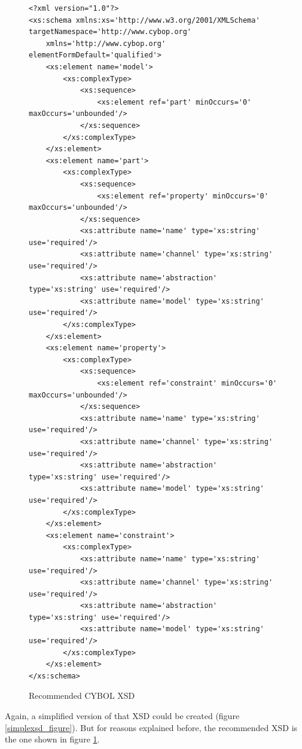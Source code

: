 \begin{figure}[ht]
    \bigskip
    \bigskip
    \begin{scriptsize}
        \begin{verbatim}
<?xml version="1.0"?>
<xs:schema xmlns:xs='http://www.w3.org/2001/XMLSchema' targetNamespace='http://www.cybop.org'
    xmlns='http://www.cybop.org' elementFormDefault='qualified'>
    <xs:element name='model'>
        <xs:complexType>
            <xs:sequence>
                <xs:element ref='part' minOccurs='0' maxOccurs='unbounded'/>
            </xs:sequence>
        </xs:complexType>
    </xs:element>
    <xs:element name='part'>
        <xs:complexType>
            <xs:sequence>
                <xs:element ref='property' minOccurs='0' maxOccurs='unbounded'/>
            </xs:sequence>
            <xs:attribute name='name' type='xs:string' use='required'/>
            <xs:attribute name='channel' type='xs:string' use='required'/>
            <xs:attribute name='abstraction' type='xs:string' use='required'/>
            <xs:attribute name='model' type='xs:string' use='required'/>
        </xs:complexType>
    </xs:element>
    <xs:element name='property'>
        <xs:complexType>
            <xs:sequence>
                <xs:element ref='constraint' minOccurs='0' maxOccurs='unbounded'/>
            </xs:sequence>
            <xs:attribute name='name' type='xs:string' use='required'/>
            <xs:attribute name='channel' type='xs:string' use='required'/>
            <xs:attribute name='abstraction' type='xs:string' use='required'/>
            <xs:attribute name='model' type='xs:string' use='required'/>
        </xs:complexType>
    </xs:element>
    <xs:element name='constraint'>
        <xs:complexType>
            <xs:attribute name='name' type='xs:string' use='required'/>
            <xs:attribute name='channel' type='xs:string' use='required'/>
            <xs:attribute name='abstraction' type='xs:string' use='required'/>
            <xs:attribute name='model' type='xs:string' use='required'/>
        </xs:complexType>
    </xs:element>
</xs:schema>
        \end{verbatim}
    \end{scriptsize}
    \caption{Recommended CYBOL XSD}
    \label{xsd_figure}
\end{figure}

Again, a simplified version of that XSD could be created (figure
\ref{simplexsd_figure}). But for reasons explained before, the recommended XSD
is the one shown in figure \ref{xsd_figure}.
